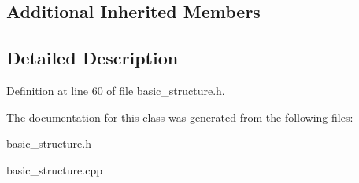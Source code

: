 \subsection*{Additional Inherited Members}


\subsection{Detailed Description}


Definition at line 60 of file basic\+\_\+structure.\+h.



The documentation for this class was generated from the following files\+:\begin{DoxyCompactItemize}
\item 
basic\+\_\+structure.\+h\item 
basic\+\_\+structure.\+cpp\end{DoxyCompactItemize}
